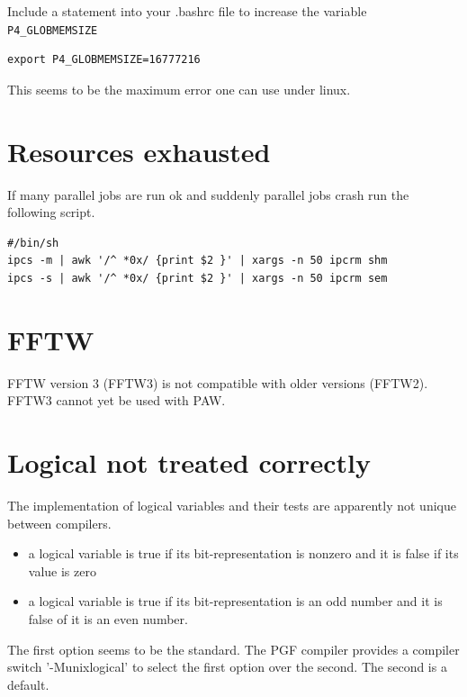 \documentclass[a4paper,10pt]{report}
\newcommand{\mytt}[1]{{\tt #1}}
\begin{document}
Include a statement into your .bashrc file to increase the variable
\mytt{P4\_GLOBMEMSIZE}
\begin{verbatim}
export P4_GLOBMEMSIZE=16777216
\end{verbatim}
This seems to be the maximum error one can use under linux.


\section{Resources exhausted}
If many parallel jobs are run ok and suddenly parallel jobs crash run the following script.
\begin{verbatim}
#/bin/sh
ipcs -m | awk '/^ *0x/ {print $2 }' | xargs -n 50 ipcrm shm
ipcs -s | awk '/^ *0x/ {print $2 }' | xargs -n 50 ipcrm sem
\end{verbatim}

\section{FFTW}

FFTW version 3 (FFTW3) is not compatible with older versions
(FFTW2). FFTW3 cannot yet be used with PAW.

\section{Logical not treated correctly}
The implementation of logical variables and their tests are apparently
not unique between compilers. 
\begin{itemize}
\item a logical variable is true if its bit-representation is nonzero
and it is false if its value is zero
\item a logical variable is true if its bit-representation is an odd
number and it is false of it is an even number.
\end{itemize}
The first option seems to be the standard.  The PGF compiler provides
a compiler switch '-Munixlogical' to select the first option over the
second. The second is a default.
\end{document}
